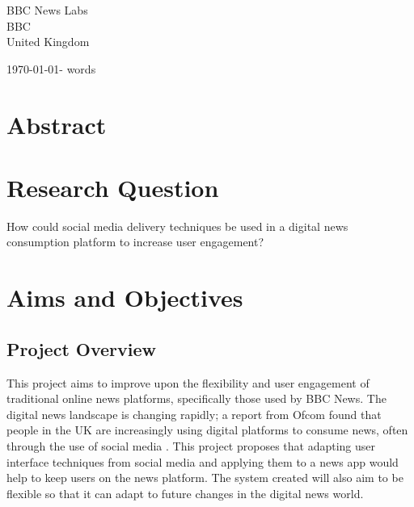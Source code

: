 \documentclass[12pt,titlepage]{article}
\newcommand\wordcount{}
\begin{document}
\begin{titlepage}
\begin{center}
\begin{multicols}{2}
  		BBC News Labs\\
  		BBC\\
  		United Kingdom\\

    \end{multicols}

    \today - \wordcount words

	\end{center}
\end{titlepage}


\tableofcontents
\newpage

\section{Abstract}

\section{Research Question}


How could social media delivery techniques be used in a digital news consumption platform to increase user engagement?

\section{Aims and Objectives}

  \subsection{Project Overview}


  This project aims to improve upon the flexibility and user engagement of
  traditional online news platforms, specifically those used by BBC News. The
  digital news landscape is changing rapidly; a report from Ofcom found that
  people in the UK are increasingly using digital platforms to consume news,
  often through the use of social media \citep{ofcom}. This project proposes that
  adapting user interface techniques from social media and applying them to a
  news app would help to keep users on the news platform. The system created
  will also aim to be flexible so that it can adapt to future changes in the
  digital news world.
\end{document}
